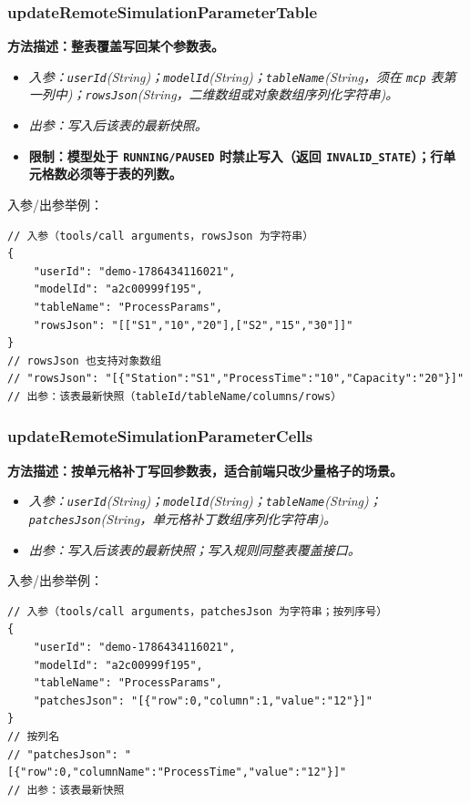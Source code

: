 \subsubsection{updateRemoteSimulationParameterTable}
\bf{方法描述}：整表覆盖写回某个参数表。
\begin{itemize}
	\item \it{入参}：\texttt{userId}(String)；\texttt{modelId}(String)；\texttt{tableName}(String，须在 \texttt{mcp} 表第一列中)；\texttt{rowsJson}(String，二维数组或对象数组序列化字符串)。
	\item \it{出参}：写入后该表的最新快照。
	\item \bf{限制}：模型处于 \texttt{RUNNING/PAUSED} 时禁止写入（返回 \texttt{INVALID\_STATE}）；行单元格数必须等于表的列数。
\end{itemize}
入参/出参举例：
\begin{lstlisting}
// 入参（tools/call arguments，rowsJson 为字符串）
{
    "userId": "demo-1786434116021",
    "modelId": "a2c00999f195",
    "tableName": "ProcessParams",
    "rowsJson": "[["S1","10","20"],["S2","15","30"]]"
}
// rowsJson 也支持对象数组
// "rowsJson": "[{"Station":"S1","ProcessTime":"10","Capacity":"20"}]"
// 出参：该表最新快照（tableId/tableName/columns/rows）
\end{lstlisting}\vspace{-30pt}

\subsubsection{updateRemoteSimulationParameterCells}
\bf{方法描述}：按单元格补丁写回参数表，适合前端只改少量格子的场景。
\begin{itemize}
	\item \it{入参}：\texttt{userId}(String)；\texttt{modelId}(String)；\texttt{tableName}(String)；\texttt{patchesJson}(String，单元格补丁数组序列化字符串)。
	\item \it{出参}：写入后该表的最新快照；写入规则同整表覆盖接口。
\end{itemize}
入参/出参举例：
\begin{lstlisting}
// 入参（tools/call arguments，patchesJson 为字符串；按列序号）
{
    "userId": "demo-1786434116021",
    "modelId": "a2c00999f195",
    "tableName": "ProcessParams",
    "patchesJson": "[{"row":0,"column":1,"value":"12"}]"
}
// 按列名
// "patchesJson": "[{"row":0,"columnName":"ProcessTime","value":"12"}]"
// 出参：该表最新快照
\end{lstlisting}\vspace{-30pt}

